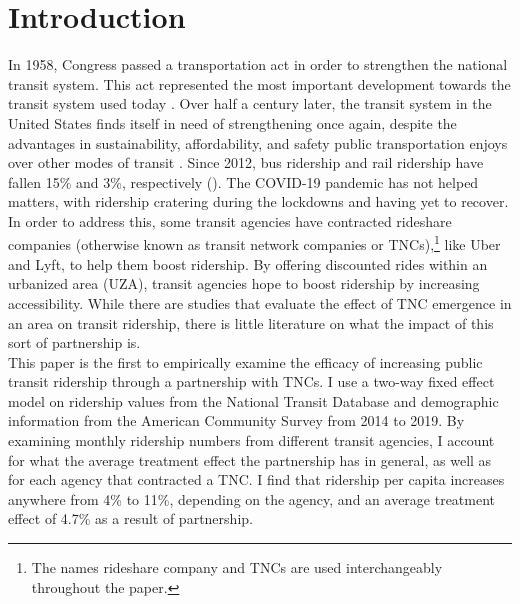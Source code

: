 \documentclass [12pt]{report}
\begin{document}
\section*{Introduction}
In 1958, Congress passed a transportation act in order to strengthen the national transit system. This act represented the most important development towards the transit system used today \parencite{ftaweb}. Over half a century later, the transit system in the United States finds itself in need of strengthening once again, despite the advantages in sustainability, affordability, and safety public transportation enjoys over other modes of transit \parencite{atpafact}. Since 2012, bus ridership and rail ridership have fallen 15\% and 3\%, respectively (\cite{erhardt22}). The COVID-19 pandemic has not helped matters, with ridership cratering during the lockdowns and having yet to recover. \\
\indent In order to address this, some transit agencies have contracted rideshare companies (otherwise known as transit network companies or TNCs),\footnote{The names rideshare company and TNCs are used interchangeably throughout the paper.} like Uber and Lyft, to help them boost ridership. By offering discounted rides within an urbanized area (UZA), transit agencies hope to boost ridership by increasing accessibility. While there are studies that evaluate the effect of TNC emergence in an area on transit ridership, there is little literature on what the impact of this sort of partnership is.\\
\indent This paper is the first to empirically examine the efficacy of increasing public transit ridership through a partnership with
TNCs. I use a two-way fixed effect model on ridership values from the National Transit Database and demographic information from the American Community Survey from 2014 to 2019. By examining monthly ridership numbers from different transit agencies, I account for what the average treatment effect the partnership has in general, as well as for each agency that contracted a TNC. I find that ridership per capita increases anywhere from 4\% to 11\%, depending on the agency, and an average treatment effect of 4.7\% as a result of partnership.

\end{document}
